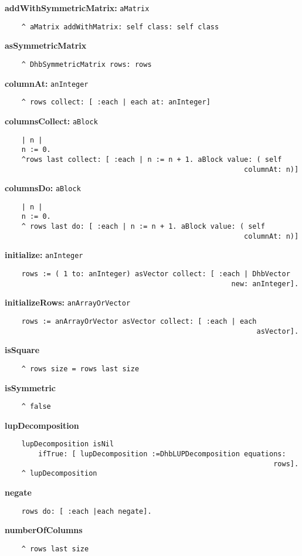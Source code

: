 {\bf addWithSymmetricMatrix:} {\tt aMatrix}
\begin{verbatim}
    ^ aMatrix addWithMatrix: self class: self class
\end{verbatim}
{\bf asSymmetricMatrix}
\begin{verbatim}
    ^ DhbSymmetricMatrix rows: rows
\end{verbatim}
{\bf columnAt:} {\tt anInteger}
\begin{verbatim}
    ^ rows collect: [ :each | each at: anInteger]
\end{verbatim}
{\bf columnsCollect:} {\tt aBlock}
\begin{verbatim}
    | n |
    n := 0.
    ^rows last collect: [ :each | n := n + 1. aBlock value: ( self 
                                                         columnAt: n)]
\end{verbatim}
{\bf columnsDo:} {\tt aBlock}
\begin{verbatim}
    | n |
    n := 0.
    ^ rows last do: [ :each | n := n + 1. aBlock value: ( self 
                                                         columnAt: n)]
\end{verbatim}
{\bf initialize:} {\tt anInteger}
\begin{verbatim}
    rows := ( 1 to: anInteger) asVector collect: [ :each | DhbVector 
                                                      new: anInteger].
\end{verbatim}
{\bf initializeRows:} {\tt anArrayOrVector}
\begin{verbatim}
    rows := anArrayOrVector asVector collect: [ :each | each 
                                                            asVector].
\end{verbatim}
{\bf isSquare}
\begin{verbatim}
    ^ rows size = rows last size
\end{verbatim}
{\bf isSymmetric}
\begin{verbatim}
    ^ false
\end{verbatim}
{\bf lupDecomposition}
\begin{verbatim}
    lupDecomposition isNil
        ifTrue: [ lupDecomposition :=DhbLUPDecomposition equations: 
                                                                rows].
    ^ lupDecomposition
\end{verbatim}
{\bf negate}
\begin{verbatim}
    rows do: [ :each |each negate].
\end{verbatim}
{\bf numberOfColumns}
\begin{verbatim}
    ^ rows last size
\end{verbatim}

